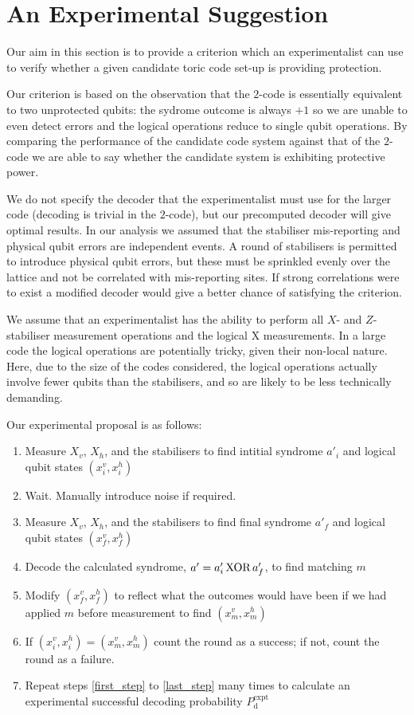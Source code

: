 \section{An Experimental Suggestion}

Our aim in this section is to provide a criterion which an experimentalist can use to verify whether a given candidate toric code set-up is providing protection.

Our criterion is based on the observation that the $2$-code is essentially equivalent to two unprotected qubits: the sydrome outcome is always $+1$ so we are unable to even detect errors and the logical operations reduce to single qubit operations. By comparing the performance of the candidate code system against that of the $2$-code we are able to say whether the candidate system is exhibiting protective power. 

We do not specify the decoder that the experimentalist must use for the larger code (decoding is trivial in the $2$-code), but our precomputed decoder will give optimal results. In our analysis we assumed that the stabiliser mis-reporting and physical qubit errors are independent events. A round of stabilisers is permitted to introduce physical qubit errors, but these must be sprinkled evenly over the lattice and not be correlated with mis-reporting sites. If strong correlations were to exist a modified decoder would give a better chance of satisfying the criterion.

We assume that an experimentalist has the ability to perform all $X$- and $Z$-stabiliser measurement operations and the logical X measurements. In a large code the logical operations are potentially tricky, given their non-local nature. Here, due to the size of the codes considered, the logical operations actually involve fewer qubits than the stabilisers, and so are likely to be less technically demanding.

Our experimental proposal is as follows:
\begin{enumerate}
  \item Measure  $X_v$, $X_h$, and the stabilisers to find intitial syndrome $a'_i$ and logical qubit states $(x^v_i, x^h_i)$\label{first_step}
  \item Wait. Manually introduce noise if required.
  \item Measure $X_v$, $X_h$, and the stabilisers to find final syndrome $a'_f$ and logical qubit states $(x^v_f, x^h_f)$
  \item Decode the calculated syndrome, $a' = a'_i \text{\,XOR\,} a'_f$, to find matching $m$ \label{decode_step}
  \item Modify $(x^v_f, x^h_f)$ to reflect what the outcomes would have been if we had applied $m$ before measurement to find $(x^v_m, x^h_m)$
  \item If $(x^v_i, x^h_i) = (x^v_m, x^h_m)$ count the round as a success; if not, count the round as a failure.\label{last_step}
  \item Repeat steps \ref{first_step} to \ref{last_step} many times to calculate an experimental successful decoding probability $P_\text{d}^\text{expt}$
\end{enumerate}


